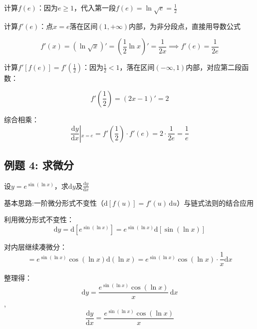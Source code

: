 \documentclass[11pt,a4paper,UTF8]{ctexart}
\begin{document}
\begin{solbox}[分步推导与答题规范]
计算$f(e)$：因为$e \ge 1$，代入第一段$f(e) = \ln\sqrt{e} = \frac{1}{2}$

计算$f'(e)$：点$x=e$落在区间$(1, +\infty)$内部，为非分段点，直接用导数公式

  
\begin{equation*}
f'(x) = (\ln\sqrt{x})' = \left(\frac{1}{2}\ln x\right)' = \frac{1}{2x} \implies f'(e) = \frac{1}{2e}
\end{equation*}


计算$f'[f(e)] = f'\left(\frac{1}{2}\right)$：因为$\frac{1}{2} < 1$，落在区间$(-\infty, 1)$内部，对应第二段函数：

  
\begin{equation*}
f'\left(\frac{1}{2}\right) = (2x - 1)' = 2
\end{equation*}


综合相乘：
\begin{equation*}
\left.\frac{\mathrm{d}y}{\mathrm{d}x}\right\vert{}_{x=e} = f'\left(\frac{1}{2}\right) \cdot f'(e) = 2 \cdot \frac{1}{2e} = \frac{1}{e}
\end{equation*}

\end{solbox}


\subsection{例题 4: 求微分}

设$y = e^{\sin(\ln x)}$，求$\mathrm{d}y$及$\frac{\mathrm{d}y}{\mathrm{d}x}$

基本思路:一阶微分形式不变性（$\mathrm{d}[f(u)] = f'(u)\,\mathrm{d}u$）与链式法则的结合应用

\begin{solbox}[分步推导与答题规范]
  利用微分形式不变性：
\begin{equation*}
\mathrm{d}y = \mathrm{d}\left[e^{\sin(\ln x)}\right] = e^{\sin(\ln x)} \mathrm{d}[\sin(\ln x)]
\end{equation*}


  对内层继续凑微分：
\begin{equation*}
= e^{\sin(\ln x)} \cos(\ln x) \mathrm{d}(\ln x) = e^{\sin(\ln x)} \cos(\ln x) \cdot \frac{1}{x} \mathrm{d}x
\end{equation*}


  整理得：
\begin{equation*}
\mathrm{d}y = \frac{e^{\sin(\ln x)} \cos(\ln x)}{x}\,\mathrm{d}x
\end{equation*}
,
\begin{equation*}
\frac{\mathrm{d}y}{\mathrm{d}x} = \frac{e^{\sin(\ln x)} \cos(\ln x)}{x}
\end{equation*}

\end{solbox}
\end{document}
